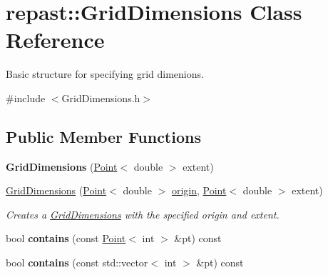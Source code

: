 \hypertarget{classrepast_1_1_grid_dimensions}{\section{repast\-:\-:Grid\-Dimensions Class Reference}
\label{classrepast_1_1_grid_dimensions}
}


Basic structure for specifying grid dimenions.  




{\ttfamily \#include $<$Grid\-Dimensions.\-h$>$}

\subsection*{Public Member Functions}
\begin{DoxyCompactItemize}
\item 
\hypertarget{classrepast_1_1_grid_dimensions_adc34342afddc8f1c2c0267522d4594f4}{{\bfseries Grid\-Dimensions} (\hyperlink{classrepast_1_1_point}{Point}$<$ double $>$ extent)}\label{classrepast_1_1_grid_dimensions_adc34342afddc8f1c2c0267522d4594f4}

\item 
\hypertarget{classrepast_1_1_grid_dimensions_a91dde52d1be653a287307ba3c5293346}{\hyperlink{classrepast_1_1_grid_dimensions_a91dde52d1be653a287307ba3c5293346}{Grid\-Dimensions} (\hyperlink{classrepast_1_1_point}{Point}$<$ double $>$ \hyperlink{classrepast_1_1_grid_dimensions_a0ec32ce3994e9903af7068aa9fd3f0f6}{origin}, \hyperlink{classrepast_1_1_point}{Point}$<$ double $>$ extent)}\label{classrepast_1_1_grid_dimensions_a91dde52d1be653a287307ba3c5293346}

\begin{DoxyCompactList}\small\item\em Creates a \hyperlink{classrepast_1_1_grid_dimensions}{Grid\-Dimensions} with the specified origin and extent. \end{DoxyCompactList}\item 
\hypertarget{classrepast_1_1_grid_dimensions_ae258f35627445ba18afeb302dde7f379}{bool {\bfseries contains} (const \hyperlink{classrepast_1_1_point}{Point}$<$ int $>$ \&pt) const }\label{classrepast_1_1_grid_dimensions_ae258f35627445ba18afeb302dde7f379}

\item 
\hypertarget{classrepast_1_1_grid_dimensions_a20572ae249735726419f0183cb2f41cd}{bool {\bfseries contains} (const std\-::vector$<$ int $>$ \&pt) const }\label{classrepast_1_1_grid_dimensions_a20572ae249735726419f0183cb2f41cd}


\end{DoxyCompactItemize}
